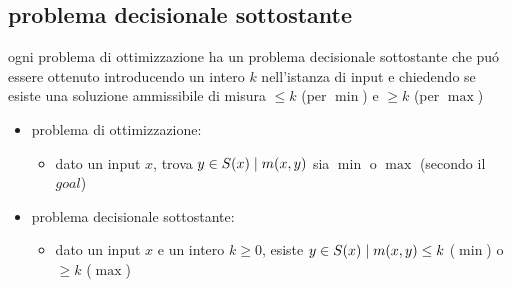 
\subsection*{problema decisionale sottostante}
\begin{flushleft}
	ogni problema di ottimizzazione ha un problema decisionale sottostante che pu\'o essere ottenuto introducendo un intero $k$ nell'istanza di input e chiedendo se esiste una soluzione ammissibile di misura $\leq k$ (per $\min$) e $\geq k$ (per $\max$)
	\begin{itemize}
		\item problema di ottimizzazione:
		\begin{itemize}
			\item dato un input $x$, trova $y\in S(x)\hspace{0.1cm}\vert\hspace{0.1cm}m(x,y)$ sia $\min$ o $\max$ (secondo il $goal$)
		\end{itemize}
		\item problema decisionale sottostante:
		\begin{itemize}
			\item dato un input $x$ e un intero $k\geq 0$, esiste $y\in S(x)\hspace{0.1cm}\vert\hspace{0.1cm}m(x,y)\leq k$ ($\min$) o $\geq k$ ($\max$)
		\end{itemize}
	\end{itemize}
\end{flushleft}


